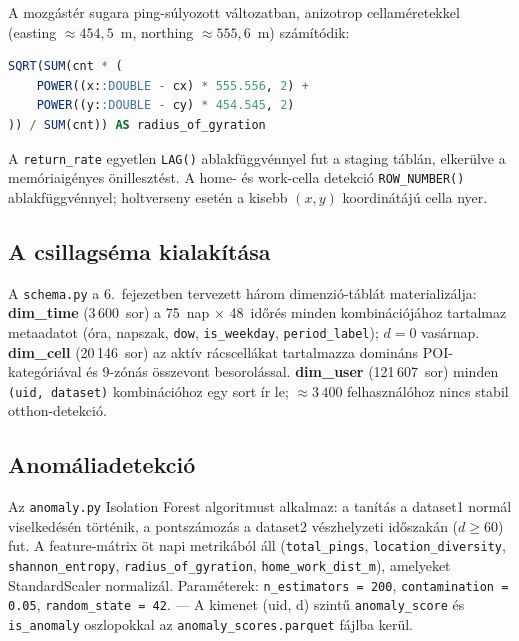A mozgástér sugara ping-súlyozott változatban, anizotrop cellaméretekkel (easting $\approx 454{,}5$~m, northing $\approx 555{,}6$~m) számítódik:

\begin{lstlisting}[language=SQL, caption={A mozgástér sugara SQL-implementációja: ping-súlyozott, anizotrop cellaméretekkel.}, label={lst:rog}, basicstyle=\small\ttfamily, breaklines=true, frame=single]
SQRT(SUM(cnt * (
    POWER((x::DOUBLE - cx) * 555.556, 2) +
    POWER((y::DOUBLE - cy) * 454.545, 2)
)) / SUM(cnt)) AS radius_of_gyration
\end{lstlisting}

A \texttt{return\_rate} egyetlen \texttt{LAG()} ablakfüggvénnyel fut a staging táblán, elkerülve a memóriaigényes önillesztést. A home- és work-cella detekció \texttt{ROW\_NUMBER()} ablakfüggvénnyel; holtverseny esetén a kisebb $(x, y)$ koordinátájú cella nyer.
\subsection{A csillagséma kialakítása}

A \texttt{schema.py} a 6.\ fejezetben tervezett három dimenzió-táblát materializálja: \textbf{dim\_time} (3\,600~sor) a 75~nap × 48~időrés minden kombinációjához tartalmaz metaadatot (óra, napszak, \texttt{dow}, \texttt{is\_weekday}, \texttt{period\_label}); $d=0$ vasárnap. \textbf{dim\_cell} (20\,146~sor) az aktív rácscellákat tartalmazza domináns POI-kategóriával és 9-zónás összevont besorolással. \textbf{dim\_user} (121\,607~sor) minden \texttt{(uid, dataset)} kombinációhoz egy sort ír le; $\approx 3\,400$ felhasználóhoz nincs stabil otthon-detekció.

\subsection{Anomáliadetekció}

Az \texttt{anomaly.py} Isolation Forest algoritmust \cite{liu2008isolation} alkalmaz: a tanítás a dataset1 normál viselkedésén történik, a pontszámozás a dataset2 vészhelyzeti időszakán ($d \geq 60$) fut. A feature-mátrix öt napi metrikából áll (\texttt{total\_pings}, \texttt{location\_diversity}, \texttt{shannon\_entropy}, \texttt{radius\_of\_gyration}, \texttt{home\_work\_dist\_m}), amelyeket StandardScaler normalizál. Paraméterek: \texttt{n\_estimators = 200}, \texttt{contamination = 0.05}, \texttt{random\_state = 42}. --- A kimenet (uid, d) szintű \texttt{anomaly\_score} és \texttt{is\_anomaly} oszlopokkal az \texttt{anomaly\_scores.parquet} fájlba kerül.